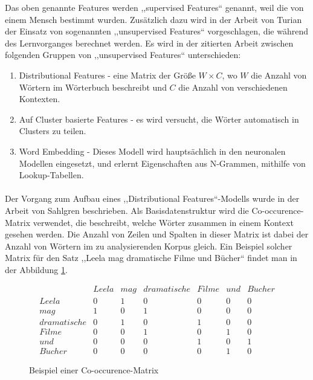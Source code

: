 Das oben genannte Features werden ,,supervised Features`` genannt, weil die von einem Mensch bestimmt wurden. Zusätzlich dazu wird in der Arbeit von Turian\cite{turian2010word} der Einsatz von sogenannten ,,unsupervised Features`` vorgeschlagen, die während des Lernvorganges berechnet werden. Es wird in der zitierten Arbeit zwischen folgenden Gruppen von ,,unsupervised Features`` unterschieden:
\begin{enumerate}
\item Distributional Features - eine Matrix der Größe $W \times C$, wo $W$ die Anzahl von Wörtern im Wörterbuch beschreibt und $C$ die Anzahl von verschiedenen Kontexten.
\item Auf Cluster basierte Features - es wird versucht, die Wörter automatisch in Clusters zu teilen.
\item Word Embedding - Dieses Modell wird hauptsächlich in den neuronalen Modellen eingesetzt, und erlernt Eigenschaften aus N-Grammen, mithilfe von Lookup-Tabellen.
\end{enumerate}

\paragraph{}
Der Vorgang zum Aufbau eines ,,Distributional Features``-Modells wurde in der Arbeit von Sahlgren\cite{sahlgren2006word} beschrieben. Als Basisdatenstruktur wird die Co-occurence-Matrix verwendet, die beschreibt, welche Wörter zusammen in einem Kontext gesehen werden. Die Anzahl von Zeilen und Spalten in dieser Matrix ist dabei der Anzahl von Wörtern im zu analysierenden Korpus gleich. Ein Beispiel solcher Matrix für den Satz ,,Leela mag dramatische Filme und Bücher`` findet man in der Abbildung \ref{fig:COOC-MAT}.

\begin{figure}[ht]
\vbox{\small}
$$
\begin{array}{ccccccc}
 & Leela & mag & dramatische & Filme & und & B\ddot{u}cher \\ 
Leela & 0 & 1 & 0 & 0 & 0 & 0 \\ 
mag & 1 & 0 & 1 & 0 & 0 & 0 \\ 
dramatische & 0 & 1 & 0 & 1 & 0 & 0 \\ 
Filme & 0 & 0 & 1 & 0 & 1 & 0 \\ 
und & 0 & 0 & 0 & 1 & 0 & 1 \\ 
B\ddot{u}cher & 0 & 0 & 0 & 0 & 1 & 0
\end{array} 
$$
\caption{Beispiel einer Co-occurence-Matrix}
\label{fig:COOC-MAT}
\end{figure}

